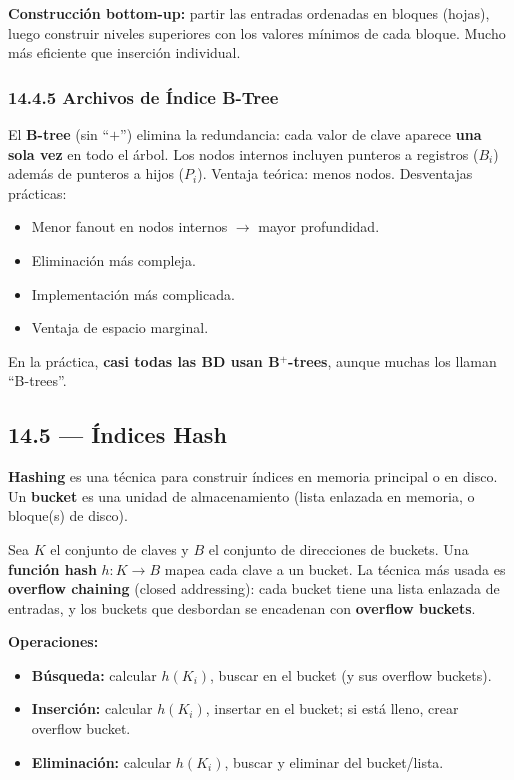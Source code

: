 \documentclass[11pt, a4paper]{article}
\begin{document}
\textbf{Construcción bottom-up:} partir las entradas ordenadas en bloques (hojas), luego construir niveles superiores con los valores mínimos de cada bloque. Mucho más eficiente que inserción individual.

\subsubsection{14.4.5 Archivos de Índice B-Tree}

El \textbf{B-tree} (sin ``$+$'') elimina la redundancia: cada valor de clave aparece \textbf{una sola vez} en todo el árbol. Los nodos internos incluyen punteros a registros ($B_i$) además de punteros a hijos ($P_i$). Ventaja teórica: menos nodos. Desventajas prácticas:
\begin{itemize}[nosep]
	\item Menor fanout en nodos internos $\rightarrow$ mayor profundidad.
	\item Eliminación más compleja.
	\item Implementación más complicada.
	\item Ventaja de espacio marginal.
\end{itemize}
En la práctica, \textbf{casi todas las BD usan B$^+$-trees}, aunque muchas los llaman ``B-trees''.

\subsection{14.5 --- Índices Hash}

\textbf{Hashing} es una técnica para construir índices en memoria principal o en disco. Un \textbf{bucket} es una unidad de almacenamiento (lista enlazada en memoria, o bloque(s) de disco).

Sea $K$ el conjunto de claves y $B$ el conjunto de direcciones de buckets. Una \textbf{función hash} $h: K \to B$ mapea cada clave a un bucket. La técnica más usada es \textbf{overflow chaining} (closed addressing): cada bucket tiene una lista enlazada de entradas, y los buckets que desbordan se encadenan con \textbf{overflow buckets}.

\textbf{Operaciones:}
\begin{itemize}[nosep]
	\item \textbf{Búsqueda:} calcular $h(K_i)$, buscar en el bucket (y sus overflow buckets).
	\item \textbf{Inserción:} calcular $h(K_i)$, insertar en el bucket; si está lleno, crear overflow bucket.
	\item \textbf{Eliminación:} calcular $h(K_i)$, buscar y eliminar del bucket/lista.
\end{itemize}
\end{document}
